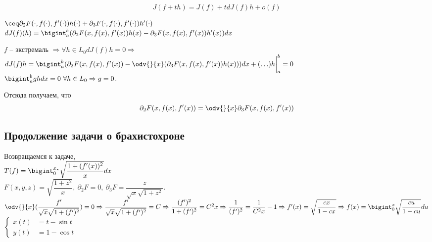 \[J(f + th) = J(f) + tdJ(f)h + o(f)\]

$\ceq \partial_2 F(\cdot, f(\cdot), f'(\cdot))h(\cdot) + \partial_3 F(\cdot, f(\cdot), f'(\cdot))h'(\cdot)$\\
$dJ(f)(h) = \bigint_a^b(\partial_2 F(x, f(x), f'(x))h(x) - \partial_3 F(x, f(x), f'(x))h'(x)) dx$

$f$ -- экстремаль $\Rightarrow \forall h \in L_0 dJ(f)h = 0 \Rightarrow$\\
$dJ(f)h = \bigint_a^b(\partial_2 F(x, f(x), f'(x)) - \odv{}{x}(\partial_3F(x, f(x), f'(x))h(x))) dx + (\ldots) h\bigg|_a^b = 0$\\
$\bigint_a^bghdx = 0\ \forall h \in L_0 \Rightarrow g = 0$.

Отсюда получаем, что
\[\partial_2F(x, f(x), f'(x)) = \odv{}{x}\partial_3F(x, f(x), f'(x))\]

\subsection{Продолжение задачи о брахистохроне}

Возвращаемся к задаче,\\
$T(f) = \bigint_0^{x_{\star}} \sqrt{\dfrac{1 + (f'(x))^2}{x}}dx$\\
$F(x, y, z) = \sqrt{\dfrac{1 + z^2}{x}}, \ \partial_2F = 0, \ \partial_3F = \dfrac{z}{\sqrt{x}\sqrt{1 + z^2}}$.\\
$\odv{}{x}(\dfrac{f'}{\sqrt{x}\sqrt{1 + (f')^2}}) = 0 \Rightarrow \dfrac{f'}{\sqrt{x}\sqrt{1 + (f')^2}} = C \Rightarrow \dfrac{(f')^2}{1 + (f')^2} = C^2x \Rightarrow \dfrac1{(f')^2} = \dfrac1{C^2x} - 1 \Rightarrow f'(x) = \sqrt{\dfrac{cx}{1 - cx}} \Rightarrow f(x) = \bigint_0^x\sqrt{\dfrac{cu}{1 - cu}}du$\\

$\left\{\begin{aligned}
x(t) &= t - \sin t \\
y(t) &= 1 - \cos t
\end{aligned}\right.$




